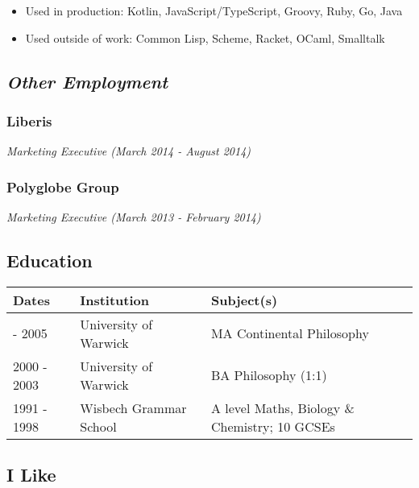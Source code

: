 \begin{itemize}
\tightlist
\item
  Used in production: Kotlin, JavaScript/TypeScript, Groovy, Ruby, Go,
  Java
\item
  Used outside of work: Common Lisp, Scheme, Racket, OCaml, Smalltalk
\end{itemize}

\hypertarget{other-employment}{%
\subsection{\texorpdfstring{\emph{Other
Employment}}{Other Employment}}\label{other-employment}}

\hypertarget{liberis}{%
\subsubsection{Liberis}\label{liberis}}

\emph{Marketing Executive (March 2014 - August 2014)}

\hypertarget{polyglobe-group}{%
\subsubsection{Polyglobe Group}\label{polyglobe-group}}

\emph{Marketing Executive (March 2013 - February 2014)}

\hypertarget{education}{%
\subsection{Education}\label{education}}

\begin{longtable}[]{@{}lll@{}}
\toprule\noalign{}
Dates & Institution & Subject(s) \\
\midrule\noalign{}
\endhead
\bottomrule\noalign{}
\endlastfoot
2003 - 2005 & University of Warwick & MA Continental Philosophy \\
2000 - 2003 & University of Warwick & BA Philosophy (1:1) \\
1991 - 1998 & Wisbech Grammar School & A level Maths, Biology \&
Chemistry; 10 GCSEs \\
\end{longtable}

\hypertarget{i-like}{%
\subsection{I Like}\label{i-like}}

